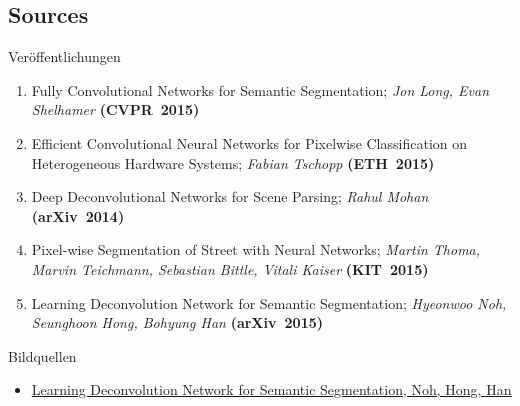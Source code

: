  \subsection*{Sources}

\begin{frame}{Veröffentlichungen}

\begin{small}

     \begin{enumerate}
         \item Fully Convolutional Networks for Semantic Segmentation; \emph{Jon Long, Evan Shelhamer} \textbf{(CVPR~2015)}
         \item Efficient Convolutional Neural Networks for Pixelwise Classification on Heterogeneous Hardware Systems; \emph{Fabian Tschopp} \textbf{(ETH~2015)}
         \item Deep Deconvolutional Networks for Scene Parsing; \emph{Rahul Mohan} \textbf{(arXiv~2014)}
         \item Pixel-wise Segmentation of Street with Neural Networks; 
         \emph{Martin Thoma, Marvin Teichmann, Sebastian Bittle, Vitali Kaiser} \textbf{(KIT~2015)}
         \item Learning Deconvolution Network for Semantic Segmentation; 
                  \emph{Hyeonwoo Noh, Seunghoon Hong, Bohyung Han} \textbf{(arXiv~2015)}
     \end{enumerate}

\end{small}
\end{frame} 

\begin{frame}{Bildquellen}


     \begin{itemize}
         \item
         \href{http://cvlab.postech.ac.kr/research/deconvnet/}{Learning Deconvolution Network for Semantic Segmentation, Noh, Hong, Han} 
     \end{itemize}

\end{frame}


